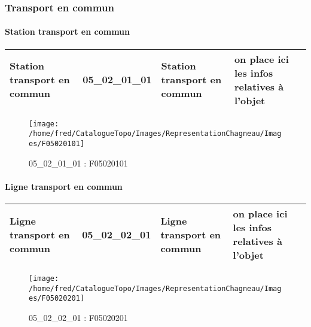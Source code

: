 \documentclass[12pt,titlepage,oneside]{book}
\begin{document}
\subsubsection{\large Transport en commun}
\paragraph{Station transport en commun}
\noindent
\vspace{\baselineskip}

\renewcommand{\arraystretch}{1.2}
\begin{supertabular}{|p{10cm}|c|p{13cm}|p{12cm}|}
 Station transport en commun & 05\_02\_01\_01 & Station transport en commun & on place ici les infos relatives à l'objet\\
\hline
\end{supertabular}
\begin{figure}[h!]
  \hfill         %
  \begin{minipage}[t]{3cm}
    \begin{center}
      \texttt{[image: /home/fred/CatalogueTopo/Images/RepresentationChagneau/Images/F05020101]}
      \caption[F05020101]{\label{} 05\_02\_01\_01 : F05020101}
    \end{center}
  \end{minipage}
\end{figure}


\paragraph{Ligne transport en commun}
\noindent
\vspace{\baselineskip}

\renewcommand{\arraystretch}{1.2}
\begin{supertabular}{|p{10cm}|c|p{13cm}|p{12cm}|}
 Ligne transport en commun & 05\_02\_02\_01 & Ligne transport en commun & on place ici les infos relatives à l'objet\\
\hline
\end{supertabular}
\begin{figure}[h!]
  \hfill         %
  \begin{minipage}[t]{3cm}
    \begin{center}
      \texttt{[image: /home/fred/CatalogueTopo/Images/RepresentationChagneau/Images/F05020201]}
      \caption[F05020201]{\label{} 05\_02\_02\_01 : F05020201}
    \end{center}
  \end{minipage}
\end{figure}
\end{document}
